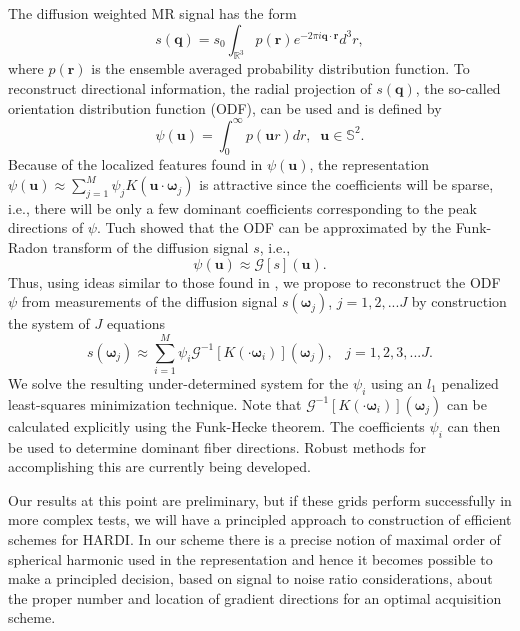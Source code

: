 \documentclass[landscape,a0b,final]{a0poster}
\newcommand{\bomega}{{\boldsymbol{\omega}}}
\newenvironment{poster}{
  \begin{center}
  \begin{minipage}[c]{0.98\textwidth}
}{
  \end{minipage} 
  \end{center}
}
\newcommand{\pbox}[4]{
\psshadowbox[#3]{
\begin{minipage}[t][#2][t]{#1}
#4
\end{minipage}
}}
\newcommand{\header}[1]{
\begin{center}\pbox{0.8\columnwidth}{}{linewidth=1mm,framearc=0.1,linecolor=lightblue,fillstyle=gradient,gradangle=0,gradbegin=white,gradend=whiteblue,gradmidpoint=1.0,framesep=1em}{\begin{center}\bf{#1}\end{center}}\end{center}
}
\begin{document}
\begin{poster}
\begin{multicols}{3}
The diffusion weighted MR signal has the form
%
\begin{equation}
  s\left(\mathbf{q}\right) = s_0\int_{\mathbb{R}^3}p\left(\mathbf{r}\right)e^{-2\pi i \mathbf{q}\cdot\mathbf{r}}d^3r,
\end{equation}
%
where $p\left(\mathbf{r}\right)$ is the ensemble averaged probability distribution function. To reconstruct directional information, the radial projection of $s\left(\mathbf{q}\right)$, the so-called orientation distribution function (ODF), can be used and is defined by
%
\begin{equation}
  \psi\left(\mathbf{u}\right) = \int_0^{\infty} p\left(\mathbf{u}r\right) dr,\;\; \mathbf{u}\in\mathbb{S}^2.
\end{equation}
Because of the localized features found in $\psi\left(\mathbf{u}\right)$, the representation $\psi\left(\mathbf{u}\right) \approx \sum_{j=1}^M \psi_j K\left(\mathbf{u}\cdot\bomega_{j}\right)$ is attractive since the coefficients will be sparse, i.e., there will be only a few dominant coefficients corresponding to the peak directions of $\psi$. Tuch \cite{TUCH-2004} showed that the ODF can be approximated by the Funk-Radon transform of the diffusion signal $s$, i.e.,
%
\begin{equation}
  \psi\left(\mathbf{u}\right) \approx \mathcal{G}\left[s\right]\left(\mathbf{u}\right).
\end{equation}
%
Thus, using ideas similar to those found in \cite{L-C-D-H-2009}, we propose to reconstruct the ODF $\psi$ from measurements of the diffusion signal $s\left(\bomega_{j}\right)$, $j=1,2,...J$ by construction the system of $J$ equations
%
\begin{equation}
  s\left(\bomega_{j}\right) \approx \sum_{i=1}^M \psi_i \mathcal{G}^{-1}\left[K\left(\cdot\bomega_{i}\right)\right]\left(\bomega_{j}\right), \;\;\;j=1,2,3,...J.
\end{equation}
%
We solve the resulting under-determined system for the $\psi_i$ using an $l_1$ penalized least-squares minimization technique. Note that $\mathcal{G}^{-1}\left[K\left(\cdot\bomega_{i}\right)\right]\left(\bomega_{j}\right)$ can be calculated explicitly using the Funk-Hecke theorem. The coefficients $\psi_i$ can then be used to determine dominant fiber directions. Robust methods for accomplishing this are currently being developed.

\header{Conclusions}

Our results at this point are preliminary, but if these grids perform
successfully in more complex tests, we will have a principled approach to
construction of efficient schemes for HARDI. In our scheme there is a precise
notion of maximal order of spherical harmonic used in the representation and
hence it becomes possible to make a principled decision, based on signal to
noise ratio considerations, about the proper number and location of gradient
directions for an optimal acquisition scheme.


\end{multicols}
\end{poster}
\end{document}
